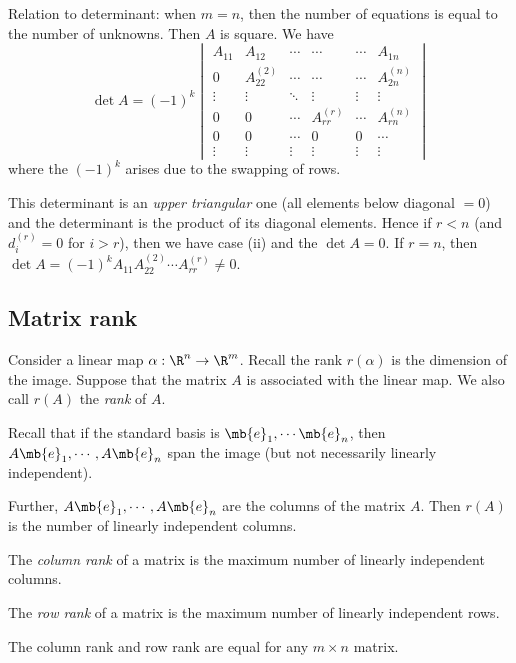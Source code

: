 \documentclass[a4paper]{article}
\begin{document}
Relation to determinant: when $m = n$, then the number of equations is equal to the number of unknowns. Then $A$ is square. We have
\[
\det A  = (-1)^k
\begin{vmatrix}
  A_{11} &A_{12}&\cdots& \cdots& \cdots & A_{1n}\\
  0 & A_{22}^{(2)} &\cdots& \cdots & \cdots & A_{2n}^{(n)} \\
  \vdots & \vdots &\ddots & \vdots & \vdots & \vdots\\
  0 & 0 & \cdots & A_{rr}^{(r)} & \cdots & A_{rn}^{(n)}\\
  0 & 0 & \cdots & 0 & 0 & \cdots\\
  \vdots & \vdots & \vdots & \vdots & \vdots & \vdots
\end{vmatrix}
\]
where the $(-1)^k$ arises due to the swapping of rows.

This determinant is an \emph{upper triangular} one (all elements below diagonal $= 0$) and the determinant is the product of its diagonal elements.
Hence if $r < n$ (and $d_i^{(r)} = 0$ for $i > r$), then we have case (ii) and the $\det A = 0$. If $r = n$, then $\det A = (-1)^k A_{11}A_{22}^{(2)}\cdots A_{rr}^{(r)} \not= 0$.

\subsection{Matrix rank}
Consider a linear map $\alpha: \R^n\to \R^m$. Recall the rank $r(\alpha)$ is the dimension of the image. Suppose that the matrix $A$ is associated with the linear map. We also call $r(A)$ the \emph{rank} of $A$.

Recall that if the standard basis is $\mb{e}_1,\cdots \mb{e}_n$, then $A\mb{e}_1, \cdots, A\mb{e}_n$ span the image (but not necessarily linearly independent).

Further, $A\mb{e}_1, \cdots, A\mb{e}_n$ are the columns of the matrix $A$. Then $r(A)$ is the number of linearly independent columns.

\begin{defi}
  The \emph{column rank} of a matrix is the maximum number of linearly independent columns.

The \emph{row rank} of a matrix is the maximum number of linearly independent rows.
\end{defi}

\begin{thm}
  The column rank and row rank are equal for any $m\times n$ matrix.
\end{thm}
\end{document}
